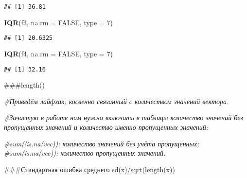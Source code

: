 \documentclass[
]{article}
\newenvironment{Shaded}{\begin{snugshade}}{\end{snugshade}}
\newcommand{\AttributeTok}[1]{\textcolor[rgb]{0.13,0.29,0.53}{#1}}
\newcommand{\CommentTok}[1]{\textcolor[rgb]{0.56,0.35,0.01}{\textit{#1}}}
\newcommand{\ConstantTok}[1]{\textcolor[rgb]{0.56,0.35,0.01}{#1}}
\newcommand{\DecValTok}[1]{\textcolor[rgb]{0.00,0.00,0.81}{#1}}
\newcommand{\FunctionTok}[1]{\textcolor[rgb]{0.13,0.29,0.53}{\textbf{#1}}}
\newcommand{\NormalTok}[1]{#1}
\begin{document}
\begin{verbatim}
## [1] 36.81
\end{verbatim}

\begin{Shaded}
\begin{Highlighting}[]
\FunctionTok{IQR}\NormalTok{(f3, }\AttributeTok{na.rm =} \ConstantTok{FALSE}\NormalTok{, }\AttributeTok{type =} \DecValTok{7}\NormalTok{)}
\end{Highlighting}
\end{Shaded}

\begin{verbatim}
## [1] 20.6325
\end{verbatim}

\begin{Shaded}
\begin{Highlighting}[]
\FunctionTok{IQR}\NormalTok{(f4, }\AttributeTok{na.rm =} \ConstantTok{FALSE}\NormalTok{, }\AttributeTok{type =} \DecValTok{7}\NormalTok{)}
\end{Highlighting}
\end{Shaded}

\begin{verbatim}
## [1] 32.16
\end{verbatim}

\#\#\#length()

\begin{Shaded}
\begin{Highlighting}[]
\CommentTok{\#Приведём лайфхак, косвенно связанный с количеством значений вектора. }

\CommentTok{\#Зачастую в работе нам нужно включить в таблицы количество значений без пропущенных значений и количество именно пропущенных значений:}

\CommentTok{\#sum(!is.na(vec)): количество значений без учёта пропущенных;}
\CommentTok{\#sum(is.na(vec)): количество пропущенных значений.}
\end{Highlighting}
\end{Shaded}

\#\#\#Стандартная ошибка среднего sd(x)/sqrt(length(x))
\end{document}
